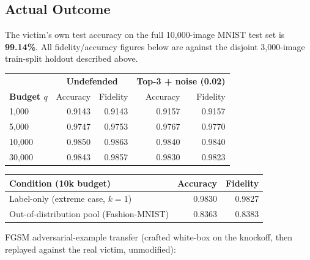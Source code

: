 \documentclass[11pt]{article}
\begin{document}
\subsection{Actual Outcome}

The victim's own test accuracy on the full 10{,}000-image MNIST test set is
\textbf{99.14\%}. All fidelity/accuracy figures below are against the
disjoint 3{,}000-image train-split holdout described above.

\begin{center}
\begin{tabular}{@{}lrrrr@{}}
\toprule
& \multicolumn{2}{c}{\textbf{Undefended}} & \multicolumn{2}{c}{\textbf{Top-3 + noise (0.02)}} \\
\textbf{Budget $q$} & Accuracy & Fidelity & Accuracy & Fidelity \\
\midrule
1{,}000   & 0.9143 & 0.9143 & 0.9157 & 0.9157 \\
5{,}000   & 0.9747 & 0.9753 & 0.9767 & 0.9770 \\
10{,}000  & 0.9850 & 0.9863 & 0.9840 & 0.9840 \\
30{,}000  & 0.9843 & 0.9857 & 0.9830 & 0.9823 \\
\bottomrule
\end{tabular}
\end{center}

\begin{center}
\begin{tabular}{@{}lrr@{}}
\toprule
\textbf{Condition (10k budget)} & Accuracy & Fidelity \\
\midrule
Label-only (extreme case, $k{=}1$) & 0.9830 & 0.9827 \\
Out-of-distribution pool (Fashion-MNIST) & 0.8363 & 0.8383 \\
\bottomrule
\end{tabular}
\end{center}

FGSM adversarial-example transfer (crafted white-box on the knockoff, then
replayed against the real victim, unmodified):
\end{document}
